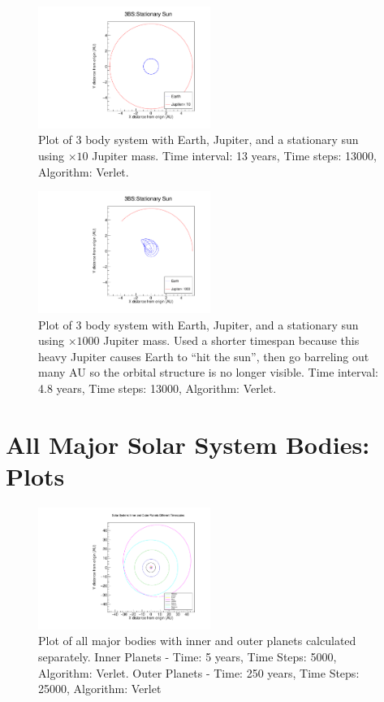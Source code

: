 \documentclass[a4paper,12pt]{report}
\begin{document}
  \begin{figure}[H]
 \centering
   \includegraphics[width=0.5\textwidth]{ESJFVerlet_x10.pdf}
  \caption{Plot of 3 body system with Earth, Jupiter, and a stationary sun using $\times 10$ Jupiter mass. Time interval: 13 years, Time steps: 13000, Algorithm: Verlet.}
  \label{fig:ESJFVerlet_x10}
 \end{figure}
 
  \begin{figure}[H]
 \centering
   \includegraphics[width=0.5\textwidth]{ESJFVerlet_x1000.pdf}
  \caption{Plot of 3 body system with Earth, Jupiter, and a stationary sun using $\times 1000$ Jupiter mass. Used a shorter timespan because this heavy Jupiter causes Earth to ``hit the sun'', then go barreling out many AU so the orbital structure is no longer visible. Time interval: 4.8 years, Time steps: 13000, Algorithm: Verlet.}
  \label{fig:ESJFVerlet_x1000}
 \end{figure}
 
 \chapter{All Major Solar System Bodies: Plots}
   \begin{figure}
 \centering
   \includegraphics[width=0.5\textwidth]{all_bodies_inner_outer_sep_Verlet.pdf}
  \caption{Plot of all major bodies with inner and outer planets calculated separately. Inner Planets - Time: 5 years, Time Steps: 5000, Algorithm: Verlet. Outer Planets - Time: 250 years, Time Steps: 25000, Algorithm: Verlet}
  \label{fig:all_bodies_inner_outer_sep_Verlet}
 \end{figure}
\end{document}
